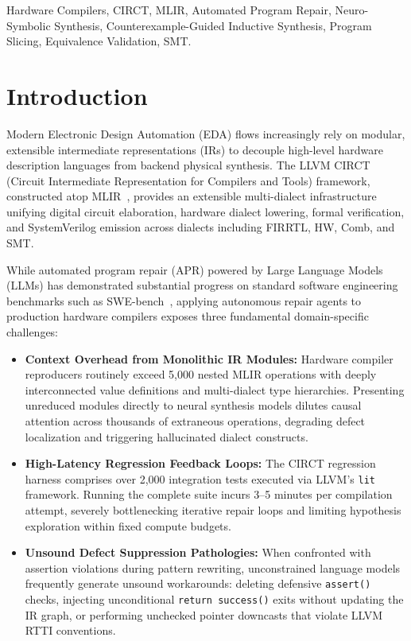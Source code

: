 \documentclass[conference]{IEEEtran}
\begin{document}
\begin{IEEEkeywords}
Hardware Compilers, CIRCT, MLIR, Automated Program Repair, Neuro-Symbolic Synthesis, Counterexample-Guided Inductive Synthesis, Program Slicing, Equivalence Validation, SMT.
\end{IEEEkeywords}

\section{Introduction}
Modern Electronic Design Automation (EDA) flows increasingly rely on modular, extensible intermediate representations (IRs) to decouple high-level hardware description languages from backend physical synthesis. The LLVM CIRCT (Circuit Intermediate Representation for Compilers and Tools) framework, constructed atop MLIR~\cite{lattner2021mlir, circt2021}, provides an extensible multi-dialect infrastructure unifying digital circuit elaboration, hardware dialect lowering, formal verification, and SystemVerilog emission across dialects including FIRRTL, HW, Comb, and SMT.

While automated program repair (APR) powered by Large Language Models (LLMs) has demonstrated substantial progress on standard software engineering benchmarks such as SWE-bench~\cite{jimenez2024swebench}, applying autonomous repair agents to production hardware compilers exposes three fundamental domain-specific challenges:
\begin{itemize}
    \item \textbf{Context Overhead from Monolithic IR Modules:} Hardware compiler reproducers routinely exceed 5,000 nested MLIR operations with deeply interconnected value definitions and multi-dialect type hierarchies. Presenting unreduced modules directly to neural synthesis models dilutes causal attention across thousands of extraneous operations, degrading defect localization and triggering hallucinated dialect constructs.
    \item \textbf{High-Latency Regression Feedback Loops:} The CIRCT regression harness comprises over 2,000 integration tests executed via LLVM's \texttt{lit} framework. Running the complete suite incurs 3--5 minutes per compilation attempt, severely bottlenecking iterative repair loops and limiting hypothesis exploration within fixed compute budgets.
    \item \textbf{Unsound Defect Suppression Pathologies:} When confronted with assertion violations during pattern rewriting, unconstrained language models frequently generate unsound workarounds: deleting defensive \texttt{assert()} checks, injecting unconditional \texttt{return success()} exits without updating the IR graph, or performing unchecked pointer downcasts that violate LLVM RTTI conventions.
\end{itemize}
\end{document}
